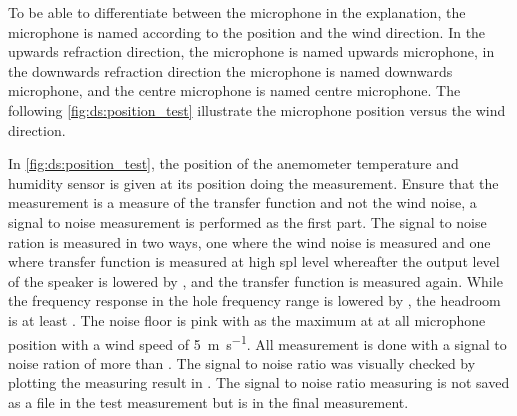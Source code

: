 To be able to differentiate between the microphone in the explanation, the microphone is named according to the position and the wind direction. In the upwards refraction direction, the microphone is named upwards microphone, in the downwards refraction direction the microphone is named downwards microphone, and the centre microphone is named centre microphone. The following \autoref{fig:ds:position_test} illustrate the microphone position versus the wind direction.


In \autoref{fig:ds:position_test}, the position of the anemometer temperature and humidity sensor is given at its position doing the measurement. Ensure that the measurement is a measure of the transfer function and not the wind noise, a signal to noise measurement is performed as the first part. The signal to noise ration is measured in two ways, one where the wind noise is measured and one where transfer function is measured at high \gls{spl} level whereafter the output level of the speaker is lowered by , and the transfer function is measured again. While the frequency response in the hole frequency range is lowered by , the headroom is at least  . The noise floor is pink with  as the maximum at  at all microphone position with a wind speed of \SI{5}{\meter\per\second}. All measurement is done with a signal to noise ration of more than . The signal to noise ratio was visually checked by plotting the measuring result in \matlab. The signal to noise ratio measuring is not saved as a file in the test measurement but is in the final measurement.




